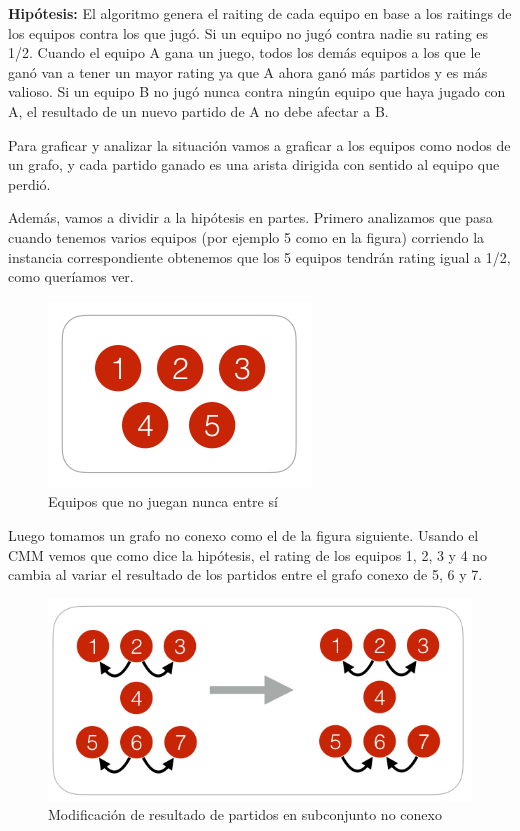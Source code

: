 \textbf{Hip\'otesis:} El algoritmo genera el raiting de cada equipo en base a los raitings de los equipos contra los que jug\'o. Si un equipo no jug\'o contra nadie su rating es 1/2. Cuando el equipo A gana un juego, todos los dem\'as equipos a los que le gan\'o van a tener un mayor rating ya que A ahora gan\'o m\'as partidos y es m\'as valioso. Si un equipo B no jug\'o nunca contra ning\'un equipo que haya jugado con A, el resultado de un nuevo partido de A no debe afectar a B.

Para graficar y analizar la situaci\'on vamos a graficar a los equipos como nodos de un grafo, y cada partido ganado es una arista dirigida con sentido al equipo que perdi\'o.

Adem\'as, vamos a dividir a la hip\'otesis en partes. Primero analizamos que pasa cuando tenemos varios equipos (por ejemplo 5 como en la figura) corriendo la instancia correspondiente obtenemos que los 5 equipos tendr\'an rating igual a 1/2, como quer\'iamos ver.

\begin{figure}[h!]
  \begin{center}
	\includegraphics[scale=0.50]{imagenes/cualitative/fairness/fairness1.png}
	\caption{Equipos que no juegan nunca entre s\'i}
  \end{center}
\end{figure}

Luego tomamos un grafo no conexo como el de la figura siguiente. Usando el CMM vemos que como dice la hip\'otesis, el rating de los equipos 1, 2, 3 y 4 no cambia al variar el resultado de los partidos entre el grafo conexo de 5, 6 y 7.

\begin{figure}[h!]
  \begin{center}
	\includegraphics[scale=0.50]{imagenes/cualitative/fairness/fairness2.png}
	\caption{Modificaci\'on de resultado de partidos en subconjunto no conexo}
  \end{center}
\end{figure}

